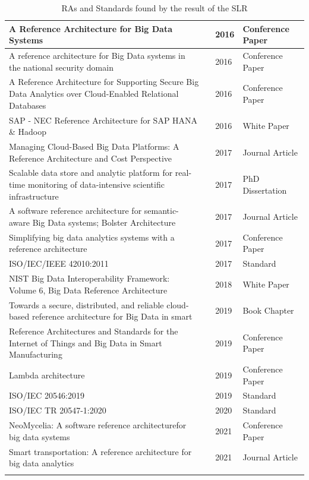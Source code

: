 \documentclass[review]{elsarticle}
\begin{document}
\begin{longtable}{|p{5cm} | p{1cm}  | p{1cm} | p{3.4cm}|}
    \hline
    A Reference Architecture for Big Data Systems  & \cite{sang2016reference}  & 2016 & Conference Paper  \\
    \hline
    A reference architecture for Big Data systems in the national security domain  & \cite{klein2016reference}  & 2016 & Conference Paper \\ [1ex]
    \hline
    A Reference Architecture for Supporting Secure Big Data Analytics over Cloud-Enabled Relational Databases  & \cite{cuzzocrea2016reference}  & 2016 & Conference Paper \\ [1ex]
    \hline
    SAP - NEC Reference Architecture for SAP HANA \& Hadoop   &
    \cite{SAPRA} & 2016 & White Paper \\ [1ex]
    \hline
    Managing Cloud-Based Big Data Platforms: A Reference Architecture and Cost Perspective  & \cite{heilig2017managing} & 2017 & Journal Article \\ [1ex]
    \hline
    Scalable data store and analytic platform for real-time monitoring of data-intensive scientific infrastructure   & \cite{heilig2017managing} & 2017 & PhD Dissertation \\ [1ex]
    \hline
    A software reference architecture for semantic-aware Big Data systems; Bolster Architecture   & \cite{nadal2017software} & 2017 & Journal Article \\ [1ex]
    \hline
    Simplifying big data analytics systems with a reference architecture
    &
    \cite{sang2017simplifying} & 2017 & Conference Paper \\ [1ex]
    \hline
    ISO/IEC/IEEE 42010:2011 & \cite{ISO42010} & 2017 & Standard \\ [1ex]
    \hline
    NIST Big Data Interoperability Framework: Volume 6, Big Data Reference Architecture
    & \cite{Chang} & 2018 & White Paper \\ [1ex]
    \hline
    Towards a secure, distributed, and reliable cloud-based reference architecture for Big Data in smart   & \cite{kohler2019towards} & 2019 & Book Chapter \\ [1ex]
    \hline
    Reference Architectures and Standards for the Internet of Things and Big Data in Smart Manufacturing   & \cite{unal2019reference} & 2019 & Conference Paper \\ [1ex]
    \hline
    Lambda architecture & \cite{kiran2015lambda} & 2019 & Conference Paper \\ [1ex]
    \hline
    ISO/IEC 20546:2019 & \cite{ISO20546} & 2019 & Standard \\ [1ex]
    \hline
    ISO/IEC TR 20547-1:2020 & \cite{ISO20547} & 2020 & Standard \\ [1ex]
    \hline
    NeoMycelia: A software reference architecturefor big data systems
    &
    \cite{AtaeiApsec} & 2021 & Conference Paper \\ [1ex]
    \hline
    Smart transportation: A reference architecture for big data analytics
    &
    \cite{castellanos2021smart} & 2021 & Journal Article \\ [1ex]
    \hline
    \caption{RAs and Standards found by the result of the SLR}
    \label{table:SLR}
\end{longtable}
\end{document}
